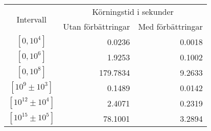 \renewcommand{\arraystretch}{1.3} %


\begin{tabular}{|c||r|r|}
    \hline
    \multirow{2}{*}{\ Intervall\ } & \multicolumn{2}{c|}{Körningstid i sekunder}\\
    \cline{2-3}
    & Utan förbättringar & Med förbättringar\\
    \hline
    $\left[0,10^{4}\right]$ & 0.0236   & 0.0018\\
    $\left[0,10^{6}\right]$ & 1.9253   & 0.1002\\
    $\left[0,10^{8}\right]$ & 179.7834 & 9.2633\\
    \hline
    $\left[10^{9}  \pm 10^{3}\right]$  & 0.1489  & 0.0142\\
    $\left[10^{12} \pm 10^{4}\right]$  & 2.4071  & 0.2319\\
    $\left[10^{15} \pm 10^{5}\right]$  & 78.1001 & 3.2894\\
    \hline
\end{tabular}
